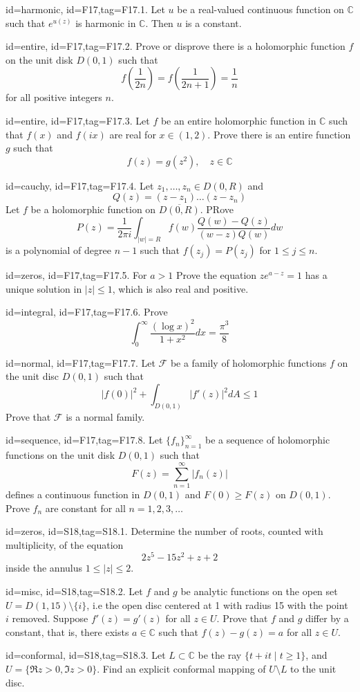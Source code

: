 \documentclass[12pt,letterpaper]{article}
\begin{document}
{%
\item[id=harmonic, id=F17,tag=F17.1.]
Let $u$ be a real-valued continuous function on $\mathbb{C}$ such that $e^{u(z)}$ is harmonic in $\mathbb{C}$. Then $u$ is a constant.
\item[id=entire, id=F17,tag=F17.2.]
Prove or disprove there is a holomorphic function $f$ on the unit disk $D(0,1)$ such that
\[
	f\left(\frac{1}{2n}\right) = f\left(\frac{1}{2n+1}\right) = \frac{1}{n}
\]
for all positive integers $n$.
\item[id=entire, id=F17,tag=F17.3.]
Let $f$ be an entire holomorphic function in $\mathbb{C}$ such that $f(x)$ and $f(ix)$ are real for $x \in (1,2)$. Prove there is an entire function $g$ such that
\[
	f(z) = g(z^2), \quad z \in \mathbb{C}
\]
\item[id=cauchy, id=F17,tag=F17.4.]
Let $z_1,\ldots,z_n \in D(0,R)$ and
\[
	Q(z) = (z - z_1)\ldots(z - z_n)
\]
Let $f$ be a holomorphic function on $\overline{D(0,R)}$. PRove
\[
	P(z) = \frac{1}{2\pi i} \int_{| w | = R} f(w) \frac{Q(w) - Q(z)}{(w - z)Q(w)} dw
\]
is a polynomial of degree $n - 1$ such that $f(z_j) = P(z_j)$ for $1 \le j \le n$.

\item[id=zeros, id=F17,tag=F17.5.]
For $a > 1$ Prove the equation $ze^{a-z} = 1$ has a unique solution in $| z | \le 1$, which is also real and positive.
\item[id=integral, id=F17,tag=F17.6.]
Prove
\[
	\int_{0}^{\infty} \frac{(\log x)^2}{1 + x^2} dx = \frac{\pi^3}{8}
\]
\item[id=normal, id=F17,tag=F17.7.]
Let $\mathcal{F}$ be a family of holomorphic functions $f$ on the unit disc $D(0,1)$ such that
\[
	| f(0) |^2 + \int_{D(0,1)} | f'(z) |^2 dA \le 1
\]
Prove that $\mathcal{F}$ is a normal family.

\item[id=sequence, id=F17,tag=F17.8.]
Let $\{f_n\}_{n=1}^{\infty}$ be a sequence of holomorphic functions on the unit disk $D(0,1)$ such that
\[
	F(z) = \sum_{n=1}^{\infty} | f_n(z) |
\]
defines a continuous function in $D(0,1)$ and $F(0) \ge F(z)$ on $D(0,1)$. Prove $f_n$ are constant for all $n = 1,2,3,\ldots$


\item[id=zeros, id=S18,tag=S18.1.]
Determine the number of roots, counted with multiplicity, of the equation
\[
	2z^5 - 15z^2 + z + 2
\]
inside the annulus $1 \le | z | \le 2$.
\item[id=misc, id=S18,tag=S18.2.]
Let $f$ and $g$ be analytic functions on the open set $U = D(1,15) \setminus \{i\}$, i.e the open disc centered at 1 with radius 15 with the point $i$ removed. Suppose $f'(z) = g'(z)$ for all $z \in U$. Prove that $f$ and $g$ differ by a constant, that is, there exists $a \in \mathbb{C}$ such that $f(z) - g(z) = a$ for all $z \in U$.
\item[id=conformal, id=S18,tag=S18.3.]
Let $L \subset \mathbb{C}$ be the ray $\{t + it \mid t \ge 1\}$, and $U = \{\Re z > 0, \Im z > 0\}$. Find an explicit conformal mapping of $U \setminus L$ to the unit disc.

}
\end{document}
